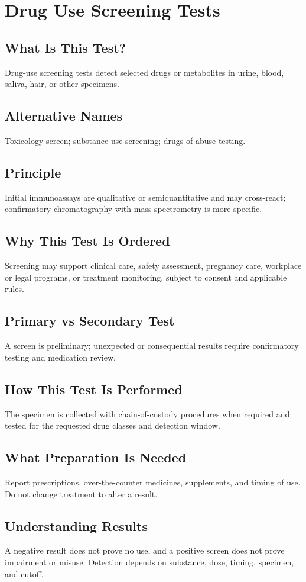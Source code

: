 \chapter{Drug Use Screening Tests}
\section*{What Is This Test?} Drug-use screening tests detect selected drugs or metabolites in urine, blood, saliva, hair, or other specimens.
\section*{Alternative Names} Toxicology screen; substance-use screening; drugs-of-abuse testing.
\section*{Principle} Initial immunoassays are qualitative or semiquantitative and may cross-react; confirmatory chromatography with mass spectrometry is more specific.
\section*{Why This Test Is Ordered} Screening may support clinical care, safety assessment, pregnancy care, workplace or legal programs, or treatment monitoring, subject to consent and applicable rules.
\section*{Primary vs Secondary Test} A screen is preliminary; unexpected or consequential results require confirmatory testing and medication review.
\section*{How This Test Is Performed} The specimen is collected with chain-of-custody procedures when required and tested for the requested drug classes and detection window.
\section*{What Preparation Is Needed} Report prescriptions, over-the-counter medicines, supplements, and timing of use. Do not change treatment to alter a result.
\section*{Understanding Results} A negative result does not prove no use, and a positive screen does not prove impairment or misuse. Detection depends on substance, dose, timing, specimen, and cutoff.
